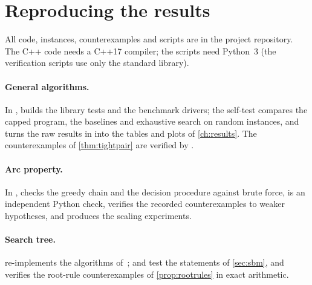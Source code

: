 \section{Reproducing the results}\label{app:repro}

All code, instances, counterexamples and scripts are in the project
repository. The C++ code needs a C++17 compiler; the scripts need
Python~3 (the verification scripts use only the standard library).

\paragraph{General algorithms.} In ,  builds the
library tests and the benchmark drivers; the self-test compares the capped
program, the baselines and exhaustive search on random instances, and
 turns the raw results in  into
the tables and plots of \cref{ch:results}. The counterexamples of
\cref{thm:tightpair} are verified by
.

\paragraph{Arc property.} In ,  checks the
greedy chain and the decision procedure against brute force, 
is an independent Python check,  verifies the
recorded counterexamples to weaker hypotheses, and  produces
the scaling experiments.

\paragraph{Search tree.}  re-implements the algorithms
of~\citet{sbm};  and  test the
statements of \cref{sec:sbm}, and  verifies the
root-rule counterexamples of \cref{prop:rootrules} in exact arithmetic.
